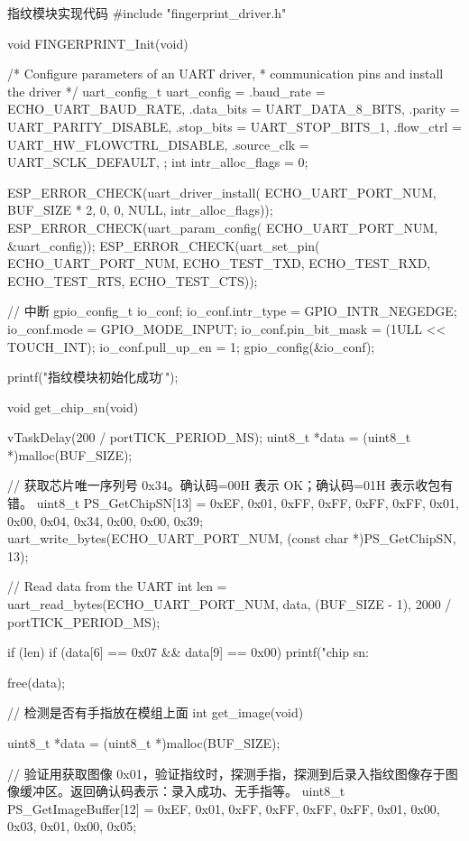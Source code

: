 \documentclass[lang=cn,newtx,10pt,scheme=chinese]{elegantbook}
\begin{document}
\begin{mycode}{指纹模块实现代码}
#include "fingerprint_driver.h"

void FINGERPRINT_Init(void)
{
    /* Configure parameters of an UART driver,
     * communication pins and install the driver */
    uart_config_t uart_config = {
        .baud_rate = ECHO_UART_BAUD_RATE,
        .data_bits = UART_DATA_8_BITS,
        .parity = UART_PARITY_DISABLE,
        .stop_bits = UART_STOP_BITS_1,
        .flow_ctrl = UART_HW_FLOWCTRL_DISABLE,
        .source_clk = UART_SCLK_DEFAULT,
    };
    int intr_alloc_flags = 0;

    ESP_ERROR_CHECK(uart_driver_install(
        ECHO_UART_PORT_NUM,
        BUF_SIZE * 2, 0, 0, NULL,
        intr_alloc_flags));
    ESP_ERROR_CHECK(uart_param_config(
        ECHO_UART_PORT_NUM, &uart_config));
    ESP_ERROR_CHECK(uart_set_pin(
        ECHO_UART_PORT_NUM,
        ECHO_TEST_TXD,
        ECHO_TEST_RXD,
        ECHO_TEST_RTS,
        ECHO_TEST_CTS));

    // 中断
    gpio_config_t io_conf;
    io_conf.intr_type = GPIO_INTR_NEGEDGE;
    io_conf.mode = GPIO_MODE_INPUT;
    io_conf.pin_bit_mask = (1ULL << TOUCH_INT);
    io_conf.pull_up_en = 1;
    gpio_config(&io_conf);

    printf("指纹模块初始化成功。\r\n");
}

void get_chip_sn(void)
{
    vTaskDelay(200 / portTICK_PERIOD_MS);
    uint8_t *data = (uint8_t *)malloc(BUF_SIZE);

    // 获取芯片唯一序列号 0x34。确认码=00H 表示 OK；确认码=01H 表示收包有错。
    uint8_t PS_GetChipSN[13] = {0xEF, 0x01, 0xFF, 0xFF, 0xFF, 0xFF, 0x01, 0x00, 0x04, 0x34, 0x00, 0x00, 0x39};
    uart_write_bytes(ECHO_UART_PORT_NUM, (const char *)PS_GetChipSN, 13);

    // Read data from the UART
    int len = uart_read_bytes(ECHO_UART_PORT_NUM, data, (BUF_SIZE - 1), 2000 / portTICK_PERIOD_MS);

    if (len)
    {
        if (data[6] == 0x07 && data[9] == 0x00)
        {
            printf("chip sn: %
        }
    }

    free(data);
}

// 检测是否有手指放在模组上面
int get_image(void)
{
    uint8_t *data = (uint8_t *)malloc(BUF_SIZE);

    // 验证用获取图像 0x01，验证指纹时，探测手指，探测到后录入指纹图像存于图像缓冲区。返回确认码表示：录入成功、无手指等。
    uint8_t PS_GetImageBuffer[12] = {0xEF, 0x01, 0xFF, 0xFF, 0xFF, 0xFF, 0x01, 0x00, 0x03, 0x01, 0x00, 0x05};

}
\end{mycode}
\end{document}
